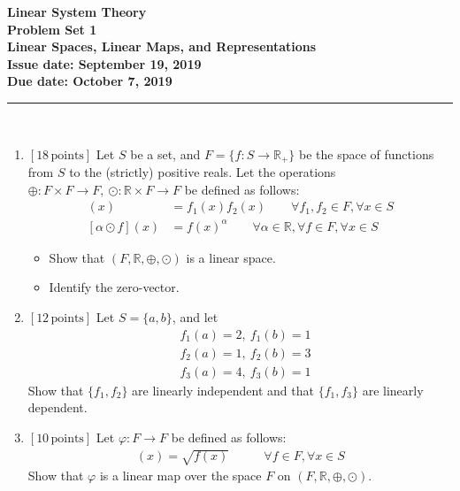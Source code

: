 \documentclass[a4paper,10.5pt]{article}
\newcommand{\R}{\mathbb{R}}
\begin{document}
\thispagestyle{plain}

\vspace*{-1.5cm}{\noindent \rule{15.8cm}{.3mm} \\[.3cm]}
\begin{center} \bf
{\large Linear System Theory \medskip \\
Problem Set 1 \\
Linear Spaces, Linear Maps, and Representations\medskip \\
Issue date: September 19, 2019 \\ Due date: October 7, 2019}
\end{center}
\rule{15.8cm}{.3mm} \\[0cm]

\begin{enumerate}
	\item {\bf$[18\, \text{points}]$}
	Let $S$ be a set, and $F = \{f: S\rightarrow \R_+ \}$ be the space of functions from $S$ to
	the (strictly) positive reals. Let the operations $\oplus:F\times F \rightarrow F,\ \odot:\R\times F\rightarrow F$ be defined as
	follows:
	\begin{align*}
	[f_1 \oplus f_2] (x) &= f_1(x)f_2(x) \quad\quad \forall f_1,f_2 \in F, \forall x\in S \\
	[\alpha \odot f] (x) &= f(x)^\alpha \quad\quad \forall \alpha\in\mathbb{R}, \forall f \in F, \forall x\in S 
	\end{align*}
	\begin{itemize}
		\item Show that $(F, \R, \oplus,\odot)$ is a linear space. 
		\item Identify the zero-vector.
	\end{itemize}
	
	\item {\bf$[12\, \text{points}]$}
	Let $S=\{a,b\}$, and let
	\begin{align*}
	&f_1(a) = 2,\ f_1(b) = 1 \\
	&f_2(a) = 1,\ f_2(b) = 3 \\ 
	&f_3(a) = 4,\ f_3(b) = 1 
	\end{align*}
	Show that $\{f_1, f_2\}$ are linearly independent and that $\{f_1, f_3\}$ are linearly dependent.
	
	\item {\bf$[10\, \text{points}]$}
	Let $\varphi:F\rightarrow F$ be defined as follows:
	\begin{align*}
	[\varphi(f)] (x) = \sqrt{f(x)} &\quad\quad \forall f\in F, \forall x\in S 
	\end{align*}
	Show that $\varphi$ is a linear map over the space $F$ on $(F, \mathbb{R}, \oplus, \odot)$.
	
\end{enumerate}
\end{document}
